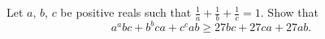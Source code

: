 Let $a$, $b$, $c$ be positive reals such that $\frac{1}{a}+\frac{1}{b}+\frac{1}{c}=1$. Show that $$a^abc+b^bca+c^cab\ge 27bc+27ca+27ab.$$

